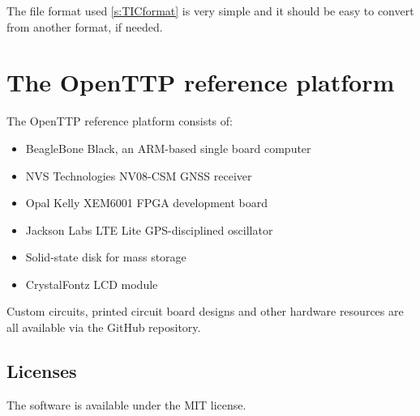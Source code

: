 	The file format used \ref{s:TICformat} is very simple and it should be easy to convert from another format, if needed.
	
\section{The OpenTTP reference platform}

The OpenTTP reference platform consists of:
\begin{itemize}
\item BeagleBone Black, an ARM-based single board computer
\item NVS Technologies NV08-CSM GNSS receiver
\item Opal Kelly XEM6001 FPGA development board
\item Jackson Labs LTE Lite GPS-disciplined oscillator
\item Solid-state disk for mass storage
\item CrystalFontz LCD module
\end{itemize}

Custom circuits, printed circuit board designs and other hardware resources are all available via the GitHub repository.

\subsection{Licenses}

The software is available under the MIT license.
